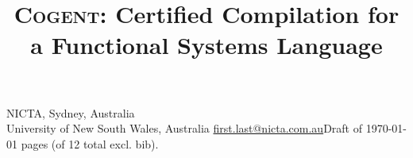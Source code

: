 \documentclass[9pt\ifFinal\else,preprint,nocopyrightspace\fi,\ifAlpha\else natbib,authoryear\fi]{sigplanconf}
\newcommand{\TODO}[1]{\textbf{\textsl{TODO: #1}}}
\newcommand{\TODO}[1]{\relax}
\begin{document}
\newtheorem{lemma}{Lemma}
\newtheorem{definition}{Definition}
\newtheorem{assumption}{Assumption}
\newtheorem{theorem}{Theorem}





\newcommand{\CDSL}{\textsc{Cogent}\xspace}
\newcommand{\cdsl}{\CDSL}
\newcommand{\DDSL}{DDSL\xspace}
\newcommand{\todo}[1]{\TODO{#1}}

\newcommand{\Cone}{\ding{172}\xspace}
\newcommand{\Ctwo}{\ding{173}\xspace}
\newcommand{\Cthree}{\ding{174}\xspace}
\newcommand{\Cfour}{\ding{175}\xspace}

\normalem

  \def\Snospace~{\S\nobreak\hspace{0.1ex}{}}
\renewcommand{\figureautorefname}{Fig.}
  \renewcommand{\sectionautorefname}{\Snospace}
  \renewcommand{\subsectionautorefname}{\Snospace}
  \renewcommand{\subsubsectionautorefname}{\Snospace}
  \renewcommand{\appendixautorefname}{Appendix}
  \renewcommand{\Hfootnoteautorefname}{Footnote}
\newcommand{\Htextbf}[1]{\textbf{\hyperpage{#1}}}

  \makeatletter
  \newsavebox{\@brx}
  \newcommand{\llangle}[1][]{\savebox{\@brx}{\(\m@th{#1\langle}\)}\mathopen{\copy\@brx\mkern2mu\kern-0.9\wd\@brx\usebox{\@brx}}}
  \newcommand{\rrangle}[1][]{\savebox{\@brx}{\(\m@th{#1\rangle}\)}\mathclose{\copy\@brx\mkern2mu\kern-0.9\wd\@brx\usebox{\@brx}}}
  \makeatother

\title{\CDSL: Certified Compilation for a Functional Systems Language}




  {NICTA, Sydney, Australia \\
            University of New South Wales, Australia}
  {\href{mailto:christine.rizkallah@nicta.com.au}{first.last@nicta.com.au}\ifDraft Draft of \today \pageref{p:lastpage} pages (of 12 total excl. bib). \fi}


  \maketitle
\end{document}
